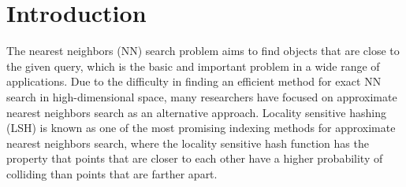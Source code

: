 \section{Introduction}
\label{sec:intro}


The nearest neighbors (NN) search problem aims to find objects that are close to the given query, which is the basic and important problem in a wide range of applications. Due to the difficulty in finding an efficient method for exact NN search in high-dimensional space, many researchers have focused on approximate nearest neighbors search as an alternative approach. Locality sensitive hashing (LSH) \cite{orilsh} is known as one of the most promising indexing methods for approximate nearest neighbors search, where the locality sensitive hash function has the property that points that are closer to each other have a higher probability of colliding than points that are farther apart.


